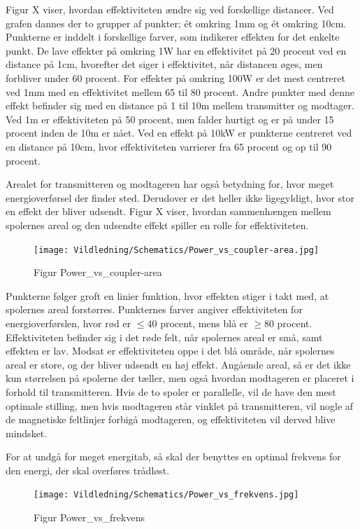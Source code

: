 Figur X viser, hvordan effektiviteten ændre sig ved forskellige distancer. Ved grafen dannes der to grupper af punkter; ét omkring 1mm og ét omkring 10cm. Punkterne er inddelt i forskellige farver, som indikerer effekten for det enkelte punkt. De lave effekter på omkring 1W har en effektivitet på 20 procent ved en distance på 1cm, hvorefter det siger i effektivitet, når distancen øges, men forbliver under 60 procent. For effekter på omkring 100W er det mest centreret ved 1mm med en effektivitet mellem 65 til 80 procent. Andre punkter med denne effekt befinder sig med en distance på 1 til 10m mellem transmitter og modtager. Ved 1m er effektiviteten på 50 procent, men falder hurtigt og er på under 15 procent inden de 10m er nået. Ved en effekt på 10kW er punkterne centreret ved en distance på 10cm, hvor effektiviteten varrierer fra 65 procent og op til 90 procent.

Arealet for transmitteren og modtageren har også betydning for, hvor meget energioverførsel der finder sted. Derudover er det heller ikke ligegyldigt, hvor stor en effekt der bliver udsendt. Figur X viser, hvordan sammenhængen mellem spolernes areal og den udsendte effekt spiller en rolle for effektiviteten.

\begin{figure}[H]
\centering
\texttt{[image: Vildledning/Schematics/Power\_vs\_coupler-area.jpg]}
\caption{Figur Power_vs_coupler-area}
\end{figure}

Punkterne følger groft en linier funktion, hvor effekten stiger i takt med, at spolernes areal forstørres. Punkternes farver angiver effektiviteten for energioverførslen, hvor rød er $\leq 40$ procent, mens blå er $\geq 80$ procent. Effektiviteten befinder sig i det røde felt, når spolernes areal er små, samt effekten er lav. Modsat er effektiviteten oppe i det blå område, når spolernes areal er store, og der bliver udsendt en høj effekt. Angående areal, så er det ikke kun størrelsen på spolerne der tæller, men også hvordan modtageren er placeret i forhold til transmitteren. Hvis de to spoler er parallelle, vil de have den mest optimale stilling, men hvis modtageren står vinklet på transmitteren, vil nogle af de magnetiske feltlinjer forbigå modtageren, og effektiviteten vil derved blive mindsket.

For at undgå for meget energitab, så skal der benyttes en optimal frekvens for den energi, der skal overføres trådløst.

\begin{figure}[H]
\centering
\texttt{[image: Vildledning/Schematics/Power\_vs\_frekvens.jpg]}
\caption{Figur Power_vs_frekvens}
\end{figure}

